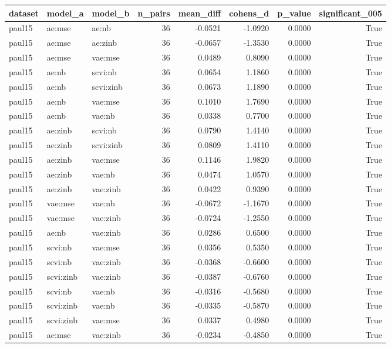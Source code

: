 \begin{tabular}{lllrrrrr}
\toprule
dataset & model\_a & model\_b & n\_pairs & mean\_diff & cohens\_d & p\_value & significant\_005 \\
\midrule
paul15 & ae:mse & ae:nb & 36 & -0.0521 & -1.0920 & 0.0000 & True \\
paul15 & ae:mse & ae:zinb & 36 & -0.0657 & -1.3530 & 0.0000 & True \\
paul15 & ae:mse & vae:mse & 36 & 0.0489 & 0.8090 & 0.0000 & True \\
paul15 & ae:nb & scvi:nb & 36 & 0.0654 & 1.1860 & 0.0000 & True \\
paul15 & ae:nb & scvi:zinb & 36 & 0.0673 & 1.1890 & 0.0000 & True \\
paul15 & ae:nb & vae:mse & 36 & 0.1010 & 1.7690 & 0.0000 & True \\
paul15 & ae:nb & vae:nb & 36 & 0.0338 & 0.7700 & 0.0000 & True \\
paul15 & ae:zinb & scvi:nb & 36 & 0.0790 & 1.4140 & 0.0000 & True \\
paul15 & ae:zinb & scvi:zinb & 36 & 0.0809 & 1.4110 & 0.0000 & True \\
paul15 & ae:zinb & vae:mse & 36 & 0.1146 & 1.9820 & 0.0000 & True \\
paul15 & ae:zinb & vae:nb & 36 & 0.0474 & 1.0570 & 0.0000 & True \\
paul15 & ae:zinb & vae:zinb & 36 & 0.0422 & 0.9390 & 0.0000 & True \\
paul15 & vae:mse & vae:nb & 36 & -0.0672 & -1.1670 & 0.0000 & True \\
paul15 & vae:mse & vae:zinb & 36 & -0.0724 & -1.2550 & 0.0000 & True \\
paul15 & ae:nb & vae:zinb & 36 & 0.0286 & 0.6500 & 0.0000 & True \\
paul15 & scvi:nb & vae:mse & 36 & 0.0356 & 0.5350 & 0.0000 & True \\
paul15 & scvi:nb & vae:zinb & 36 & -0.0368 & -0.6600 & 0.0000 & True \\
paul15 & scvi:zinb & vae:zinb & 36 & -0.0387 & -0.6760 & 0.0000 & True \\
paul15 & scvi:nb & vae:nb & 36 & -0.0316 & -0.5680 & 0.0000 & True \\
paul15 & scvi:zinb & vae:nb & 36 & -0.0335 & -0.5870 & 0.0000 & True \\
paul15 & scvi:zinb & vae:mse & 36 & 0.0337 & 0.4980 & 0.0000 & True \\
paul15 & ae:mse & vae:zinb & 36 & -0.0234 & -0.4850 & 0.0000 & True \\

\end{tabular}
